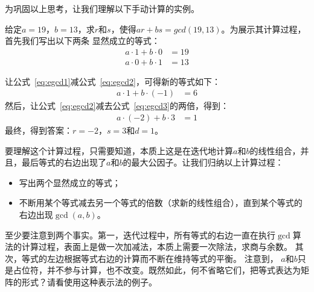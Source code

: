 为巩固以上思考，让我们理解以下手动计算的实例。
\begin{example}
\label{exm:egcd1}
	给定$a = 19$，$b = 13$，求$r$和$s$，使得$ar + bs = gcd(19, 13)$。为展示其计算过程，首先我们写出以下两条
	显然成立的等式：
		\begin{align}
			a\cdot 1 + b\cdot 0 &= 19 \label{eq:egcd1} \\
			a\cdot 0 + b\cdot 1 &= 13 \label{eq:egcd2}
		\end{align}
	
让公式~\ref{eq:egcd1}减公式~\ref{eq:egcd2}，可得新的等式如下：
	 \begin{align}
	 a \cdot 1 + b\cdot (-1) &= 6 \label{eq:egcd3}
	 \end{align}
然后，让公式~\ref{eq:egcd2}减去公式~\ref{eq:egcd3}的两倍，得到：
	\begin{align}
	a \cdot (-2) + b\cdot 3 &= 1 \label{eq:egcd4}
	\end{align}
最终，得到答案：$r = -2$，$s = 3$和$d = 1$。
\end{example}

要理解这个计算过程，只需要知道，本质上这是在迭代地计算$a$和$b$的线性组合，并且，最后等式的右边出现了$a$和$b$的最大公因子。让我们归纳以上计算过程：
\begin{itemize}
	\item 写出两个显然成立的等式；
	
	\item 不断用某个等式减去另一个等式的倍数（求新的线性组合），直到某个等式的右边出现$\gcd(a,b)$。
\end{itemize}
至少要注意到两个事实。第一，迭代过程中，所有等式的右边一直在执行$\gcd$算法的计算过程，表面上是做一次加减法，本质上需要一次除法，求商与余数。
其次，等式的左边根据等式右边的计算而不断在维持等式的平衡。
注意到，
$a$和$b$只是占位符，并不参与计算，也不改变。既然如此，何不省略它们，把等式表达为矩阵的形式？请看使用这种表示法的例子。

